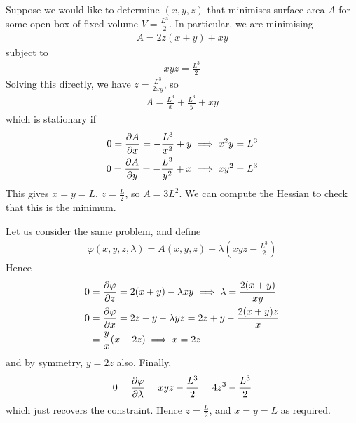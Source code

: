 \documentclass{../template/note}
\begin{document}
    \begin{example*}
        Suppose we would like to determine $(x, y, z)$ that minimises surface area $A$ for some open box of fixed volume $V = \frac{L^3}{2}$. In particular, we are minimising
        \begin{align*}
            A = 2z(x+y) + xy
        \end{align*}
        subject to
        \begin{align*}
            xyz = \frac{L^3}{2}
        \end{align*}
        Solving this directly, we have $z = \frac{L^3}{2xy}$, so
        \begin{align*}
            A = \frac{L^3}{x} + \frac{L^3}{y} + xy
        \end{align*}
        which is stationary if
        \begin{align*}
            0 = \pd{A}{x} = -\frac{L^3}{x^2} + y \implies x^2y = L^3 \\
            0 = \pd{A}{y} = -\frac{L^3}{y^2} + x \implies xy^2 = L^3
        \end{align*}
        This gives $x=y=L$, $z = \frac L 2$, so $A = 3L^2$. We can compute the Hessian to check that this is the minimum.       
    \end{example*}
    
    \begin{example*}
        Let us consider the same problem, and define
        \begin{align*}
            \varphi(x,y,z,\lambda) = A(x,y,z) - \lambda\left(xyz-\frac{L^3}{2}\right)
        \end{align*}
        Hence
        \begin{align*}
            0 &= \pd{\varphi}{z} = 2(x+y)-\lambda xy \implies \lambda = \frac{2(x+y)}{xy} \\
            0 &= \pd{\varphi}{x} = 2z+y-\lambda yz = 2z + y - \frac{2(x+y)z}{x} \\
            &= \frac y x (x-2z) \implies x = 2z
        \end{align*}
        and by symmetry, $y=2z$ also. Finally,
        \begin{align*}
            0 = \pd{\varphi}{\lambda} = xyz-\frac{L^3}{2} = 4z^3 - \frac{L^3}{2}
        \end{align*}
        which just recovers the constraint. Hence $z = \frac L 2$, and $x=y=L$ as required.
    \end{example*}
    
\end{document}
